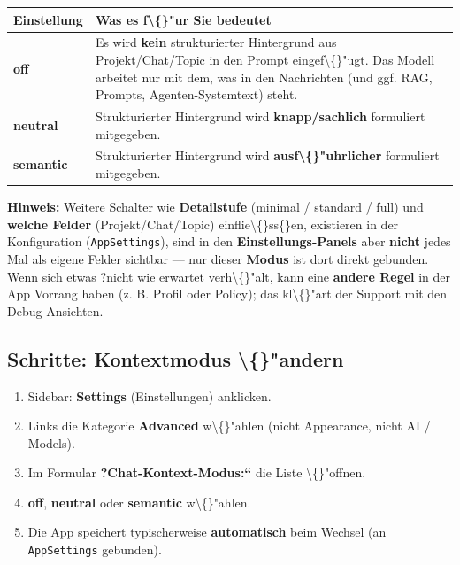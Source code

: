 \begin{center}
\begin{tabular}{ll}
\hline
Einstellung & Was es f\textbackslash\{\}"ur Sie bedeutet \\
\hline
\textbf{off} & Es wird \textbf{kein} strukturierter Hintergrund aus Projekt/Chat/Topic in den Prompt eingef\textbackslash\{\}"ugt. Das Modell arbeitet nur mit dem, was in den Nachrichten (und ggf. RAG, Prompts, Agenten-Systemtext) steht. \\
\textbf{neutral} & Strukturierter Hintergrund wird \textbf{knapp/sachlich} formuliert mitgegeben. \\
\textbf{semantic} & Strukturierter Hintergrund wird \textbf{ausf\textbackslash\{\}"uhrlicher} formuliert mitgegeben. \\
\hline
\end{tabular}
\end{center}

\textbf{Hinweis:} Weitere Schalter wie \textbf{Detailstufe} (minimal / standard / full) und \textbf{welche Felder} (Projekt/Chat/Topic) einflie\textbackslash\{\}ss\{\}en, existieren in der Konfiguration (\texttt{AppSettings}), sind in den \textbf{Einstellungs-Panels} aber \textbf{nicht} jedes Mal als eigene Felder sichtbar --- nur dieser \textbf{Modus} ist dort direkt gebunden. Wenn sich etwas ?nicht wie erwartet\texttt{} verh\textbackslash\{\}"alt, kann eine \textbf{andere Regel} in der App Vorrang haben (z. B. Profil oder Policy); das kl\textbackslash\{\}"art der Support mit den Debug-Ansichten.

\subsection{Schritte: Kontextmodus \textbackslash\{\}"andern}

\begin{enumerate}
\item Sidebar: \textbf{Settings} (Einstellungen) anklicken.
\item Links die Kategorie \textbf{Advanced} w\textbackslash\{\}"ahlen (nicht Appearance, nicht AI / Models).
\item Im Formular \textbf{?Chat-Kontext-Modus:``} die Liste \textbackslash\{\}"offnen.
\item \textbf{off}, \textbf{neutral} oder \textbf{semantic} w\textbackslash\{\}"ahlen.
\item Die App speichert typischerweise \textbf{automatisch} beim Wechsel (an \texttt{AppSettings} gebunden).
\end{enumerate}

